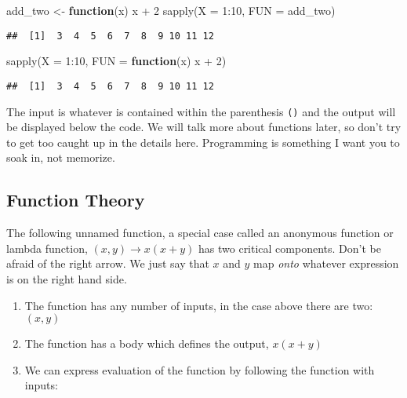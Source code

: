 \documentclass[
]{book}
\newenvironment{Shaded}{\begin{snugshade}}{\end{snugshade}}
\newcommand{\AttributeTok}[1]{\textcolor[rgb]{0.77,0.63,0.00}{#1}}
\newcommand{\ControlFlowTok}[1]{\textcolor[rgb]{0.13,0.29,0.53}{\textbf{#1}}}
\newcommand{\DecValTok}[1]{\textcolor[rgb]{0.00,0.00,0.81}{#1}}
\newcommand{\FunctionTok}[1]{\textcolor[rgb]{0.00,0.00,0.00}{#1}}
\newcommand{\NormalTok}[1]{#1}
\newcommand{\OtherTok}[1]{\textcolor[rgb]{0.56,0.35,0.01}{#1}}
\newcommand{\SpecialCharTok}[1]{\textcolor[rgb]{0.00,0.00,0.00}{#1}}
\providecommand{\tightlist}{%
  \setlength{\itemsep}{0pt}\setlength{\parskip}{0pt}}
\begin{document}
\begin{Shaded}
\begin{Highlighting}[]
\NormalTok{add\_two }\OtherTok{\textless{}{-}} \ControlFlowTok{function}\NormalTok{(x) x }\SpecialCharTok{+} \DecValTok{2}
\FunctionTok{sapply}\NormalTok{(}\AttributeTok{X =} \DecValTok{1}\SpecialCharTok{:}\DecValTok{10}\NormalTok{, }\AttributeTok{FUN =}\NormalTok{ add\_two) }
\end{Highlighting}
\end{Shaded}

\begin{verbatim}
##  [1]  3  4  5  6  7  8  9 10 11 12
\end{verbatim}

\begin{Shaded}
\begin{Highlighting}[]
\FunctionTok{sapply}\NormalTok{(}\AttributeTok{X =} \DecValTok{1}\SpecialCharTok{:}\DecValTok{10}\NormalTok{, }\AttributeTok{FUN =} \ControlFlowTok{function}\NormalTok{(x) x }\SpecialCharTok{+} \DecValTok{2}\NormalTok{)}
\end{Highlighting}
\end{Shaded}

\begin{verbatim}
##  [1]  3  4  5  6  7  8  9 10 11 12
\end{verbatim}

The input is whatever is contained within the parenthesis \texttt{()} and the output will be displayed below the code. We will talk more about functions later, so don't try to get too caught up in the details here. Programming is something I want you to soak in, not memorize.

\hypertarget{function-theory}{%
\subsection{Function Theory}\label{function-theory}}

The following unnamed function, a special case called an anonymous function or lambda function, \((x, y)\rightarrow x(x + y)\) has two critical components. Don't be afraid of the right arrow. We just say that \(x\) and \(y\) map \emph{onto} whatever expression is on the right hand side.

\begin{enumerate}
\def\labelenumi{\arabic{enumi}.}
\tightlist
\item
  The function has any number of inputs, in the case above there are two: \((x,y)\)
\item
  The function has a body which defines the output, \(x(x + y)\)
\item
  We can express evaluation of the function by following the function with inputs:
\end{enumerate}
\end{document}
